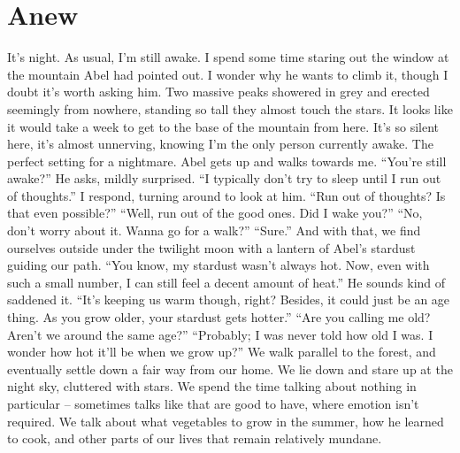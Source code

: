 \documentclass[openany, 12pt]{book}
\newcommand\tab[1][1cm]{\hspace*{#1}}
\begin{document}
\chapter{Anew}
\tab
It’s night. As usual, I’m still awake. I spend some time staring out the window at the mountain Abel had pointed out. I wonder why he wants to climb it, though I doubt it’s worth asking him. Two massive peaks showered in grey and erected seemingly from nowhere, standing so tall they almost touch the stars. It looks like it would take a week to get to the base of the mountain from here. It’s so silent here, it’s almost unnerving, knowing I’m the only person currently awake. The perfect setting for a nightmare.
\newline
\tab
Abel gets up and walks towards me. ``You’re still awake?'' He asks, mildly surprised.
\newline
\tab
``I typically don’t try to sleep until I run out of thoughts.'' I respond, turning around to look at him.
\newline
\tab
``Run out of thoughts? Is that even possible?''
\newline
\tab
``Well, run out of the good ones. Did I wake you?''
\newline
\tab
``No, don’t worry about it. Wanna go for a walk?''
\newline
\tab
``Sure.'' And with that, we find ourselves outside under the twilight moon with a lantern of Abel’s stardust guiding our path.
\newline
\tab
``You know, my stardust wasn’t always hot. Now, even with such a small number, I can still feel a decent amount of heat.'' He sounds kind of saddened it.
\newline
\tab
``It’s keeping us warm though, right? Besides, it could just be an age thing. As you grow older, your stardust gets hotter.''
\newline
\tab
``Are you calling me old? Aren’t we around the same age?''
\newline
\tab
``Probably; I was never told how old I was. I wonder how hot it’ll be when we grow up?'' We walk parallel to the forest, and eventually settle down a fair way from our home. We lie down and stare up at the night sky, cluttered with stars. We spend the time talking about nothing in particular -- sometimes talks like that are good to have, where emotion isn’t required. We talk about what vegetables to grow in the summer, how he learned to cook, and other parts of our lives that remain relatively mundane.
\newline
\end{document}
